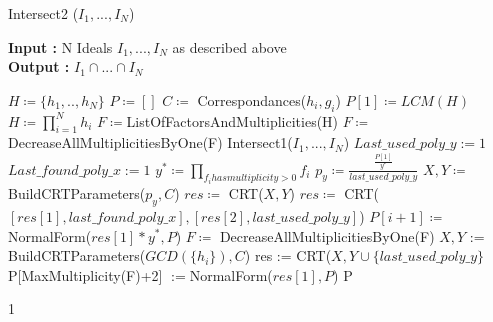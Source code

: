 \documentclass{article}
\begin{document}
\begin{algorithm}
    \caption{Intersect2 ($I_{1},...,I_{N}$)}\label{alg:intersect-2-ideals-diff-gcd}
    \textbf{Input : } N Ideals $I_{1},...,I_{N}$ as described above \\
    \textbf{Output : }$I_{1} \cap ...\cap I_ {N}$
\begin{algorithmic}
    \State $H \coloneqq \{h_{1},..,h_{N}\}$
    \State $P \coloneqq []$
    \State $C \coloneqq $ Correspondances($h_{i},g_{i}$)
    \State $P[1] \coloneqq LCM(H)$
    \State $H \coloneqq \prod^{N}_{i=1} h_{i}$
    \State $F \coloneqq $ListOfFactorsAndMultiplicities(H)
    \State $F \coloneqq $DecreaseAllMultiplicitiesByOne(F)
        \State \Return Intersect1($I_{1},...,I_{N}$)
    \EndIf
    \State $Last\_used\_poly\_y := 1$
    \State $Last\_found\_poly\_x := 1$
        \State $y^{*}\coloneqq \prod_{f_{i} has multiplicity > 0} f_{i}$
        \State $p_y\coloneqq \frac{\frac{P[1]}{y^{*}}}{last\_used\_poly\_y}$
        \State $X, Y\coloneqq$ BuildCRTParameters($p_y, C$)
        \State $res \coloneqq $ CRT($X,Y$)
            \State $res \coloneqq $ CRT($[res[1],last\_found\_poly\_x],[res[2],last\_used\_poly\_y]$)
        \EndIf
        \State $P[i+1] \coloneqq $ NormalForm($res[1]*y^{*},P$)
        \State $F \coloneqq $ DecreaseAllMultiplicitiesByOne(F)
    \EndFor
    \State $X,Y$ := BuildCRTParameters($GCD(\{h_{i}\}),C$)
    \State res := CRT($X,Y\cup\{last\_used\_poly\_y\}$
    \State P[MaxMultiplicity(F)+2] $:= $NormalForm($res[1],P$)
    \State \Return P

1\end{algorithmic}
\end{algorithm}
\nocite{*}
\printbibliography
\end{document}
